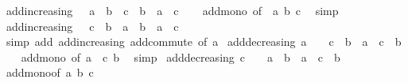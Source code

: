 \begin{isabellebody}
%
\endisadelimproof
\isanewline
{}\isamarkupfalse%
\ add{\isacharunderscore}{\kern0pt}increasing{\isacharcolon}{\kern0pt}\ {\isachardoublequoteopen}{}\ {\isasymle}\ a\ {\isasymLongrightarrow}\ b\ {\isasymle}\ c\ {\isasymLongrightarrow}\ b\ {\isasymle}\ a\ {\isacharplus}{\kern0pt}\ c{\isachardoublequoteclose}\isanewline
%
\isadelimproof
\ \ %
\endisadelimproof
%
\isatagproof
{}\isamarkupfalse%
\ add{\isacharunderscore}{\kern0pt}mono\ {\isacharbrackleft}{\kern0pt}of\ {}\ a\ b\ c{\isacharbrackright}{\kern0pt}\ \isamarkupfalse%
\ simp%
\endisatagproof
{\isafoldproof}%
%
\isadelimproof
\isanewline
%
\endisadelimproof
\isanewline
{}\isamarkupfalse%
\ add{\isacharunderscore}{\kern0pt}increasing{}{\isacharcolon}{\kern0pt}\ {\isachardoublequoteopen}{}\ {\isasymle}\ c\ {\isasymLongrightarrow}\ b\ {\isasymle}\ a\ {\isasymLongrightarrow}\ b\ {\isasymle}\ a\ {\isacharplus}{\kern0pt}\ c{\isachardoublequoteclose}\isanewline
%
\isadelimproof
\ \ %
\endisadelimproof
%
\isatagproof
{}\isamarkupfalse%
\ {\isacharparenleft}{\kern0pt}simp\ add{\isacharcolon}{\kern0pt}\ add{\isacharunderscore}{\kern0pt}increasing\ add{\isachardot}{\kern0pt}commute\ {\isacharbrackleft}{\kern0pt}of\ a{\isacharbrackright}{\kern0pt}{\isacharparenright}{\kern0pt}%
\endisatagproof
{\isafoldproof}%
%
\isadelimproof
\isanewline
%
\endisadelimproof
\isanewline
{}\isamarkupfalse%
\ add{\isacharunderscore}{\kern0pt}decreasing{\isacharcolon}{\kern0pt}\ {\isachardoublequoteopen}a\ {\isasymle}\ {}\ {\isasymLongrightarrow}\ c\ {\isasymle}\ b\ {\isasymLongrightarrow}\ a\ {\isacharplus}{\kern0pt}\ c\ {\isasymle}\ b{\isachardoublequoteclose}\isanewline
%
\isadelimproof
\ \ %
\endisadelimproof
%
\isatagproof
{}\isamarkupfalse%
\ add{\isacharunderscore}{\kern0pt}mono\ {\isacharbrackleft}{\kern0pt}of\ a\ {}\ c\ b{\isacharbrackright}{\kern0pt}\ \isamarkupfalse%
\ simp%
\endisatagproof
{\isafoldproof}%
%
\isadelimproof
\isanewline
%
\endisadelimproof
\isanewline
{}\isamarkupfalse%
\ add{\isacharunderscore}{\kern0pt}decreasing{}{\isacharcolon}{\kern0pt}\ {\isachardoublequoteopen}c\ {\isasymle}\ {}\ {\isasymLongrightarrow}\ a\ {\isasymle}\ b\ {\isasymLongrightarrow}\ a\ {\isacharplus}{\kern0pt}\ c\ {\isasymle}\ b{\isachardoublequoteclose}\isanewline
%
\isadelimproof
\ \ %
\endisadelimproof
%
\isatagproof
{}\isamarkupfalse%
\ add{\isacharunderscore}{\kern0pt}mono{\isacharbrackleft}{\kern0pt}of\ a\ b\ c\ {}{\isacharbrackright}{\kern0pt}\ \isamarkupfalse%

\end{isabellebody}

